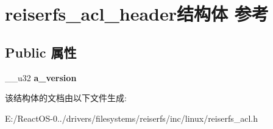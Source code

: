 \hypertarget{structreiserfs__acl__header}{}\section{reiserfs\+\_\+acl\+\_\+header结构体 参考}
\label{structreiserfs__acl__header}
\subsection*{Public 属性}
\begin{DoxyCompactItemize}
\item 
\mbox{\label{structreiserfs__acl__header_aaf0d518575e4b4e39dfc2b5013cea467}} 
\+\_\+\+\_\+u32 {\bfseries a\+\_\+version}
\end{DoxyCompactItemize}


该结构体的文档由以下文件生成\+:\begin{DoxyCompactItemize}
\item 
E\+:/\+React\+O\+S-\/0../drivers/filesystems/reiserfs/inc/linux/reiserfs\+\_\+acl.\+h\end{DoxyCompactItemize}
